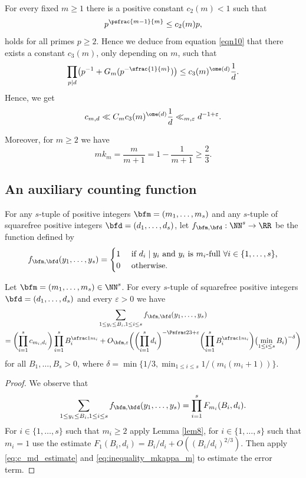 For every fixed $m\geq 1$ there is a positive constant $c_2(m)<1$ such that
\[
p^{\psfrac{m-1}{m}}\leq c_2(m) p,
\]
holds for all primes $p\geq 2$. Hence we deduce from equation \eqref{eqn10}
that there exists a constant $c_3(m)$, only depending on $m$, such that
\begin{equation}\label{eqn11}
\prod_{p\mid d} \bigl(p^{-1}+G_{m}(p^{-\sfrac{1}{m}})\bigr)
\leq c_3(m)^{\ome(d)}\frac{1}{d}.
\end{equation}
Hence, we get
\begin{equation}
\label{eq:c_md_estimate}
c_{m,d}
\ll C_m c_3(m)^{\ome(d)}\frac{1}{d}
\ll_{m,\varepsilon}d^{-1+\varepsilon}.
\end{equation}

Moreover, for $m\geq 2$ we have
\begin{equation}
\label{eq:inequality_mkappa_m}
m k_m=\frac m{m+1}=1-\frac 1{m+1}\geq \frac 23.
\end{equation}

\subsection{An auxiliary counting function}
\label{sec:counting_function_f}
For any $s$-tuple of positive integers $\bfm=(m_1,\dots,m_s)$ and any $s$-tuple of squarefree positive integers $\bfd=(d_1,\dots,d_s)$,
let $f_{\bfm, \bfd} : \NN^s \to \RR$ be the function defined by
\[
f_{\bfm, \bfd}(y_1,\dots,y_s)=\begin{cases}
1 & \text{ if $d_i\mid y_i$ and $y_i$ is $m_i$-full $ \forall i\in\{1,\dots,s\}$,}\\
0 & \text{ otherwise.}
\end{cases}
\]
\begin{lemma}
\label{lem:counting_function_f}
Let $\bfm=(m_1,\dots,m_s)\in\NN^s$. For every $s$-tuple of squarefree positive integers $\bfd=(d_1,\dots,d_s)$ and every $\varepsilon>0$ we have
\begin{multline*}
\sum_{1\leq y_i\leq B_i, 1\leq i\leq s} f_{\bfm, \bfd}(y_1,\dots,y_s) \\
=\biggl(\prod_{i=1}^s c_{m_i,d_i}\biggr)\prod_{i=1}^s B_i^{\sfrac1{m_i} }
+O_{\bfm, \varepsilon}\biggl(\biggl(\prod_{i=1}^sd_i\biggr)^{-\Psfrac23+\varepsilon}\biggl(\prod_{i=1}^s B_i^{\sfrac1{m_i}}\biggr)\bigl(\min_{1\leq i\leq s} B_i\bigr)^{-\delta}\biggr)
\end{multline*}
for all $B_1,\dots,B_s>0$,
where $\delta=\min \{ 1/3 , \min_{1\leq i\leq s}1/(m_i(m_i+1)) \}$.
\end{lemma}
\begin{proof}
We observe that
\[
\sum_{1\leq y_i\leq B_i, 1\leq i\leq s} f_{\bfm, \bfd}(y_1,\dots,y_s) = \prod_{i=1}^s F_{m_i}(B_i,d_i).
\]
For $i\in\{1,\dots,s\}$ such that $m_i\geq 2$ apply Lemma \ref{lem8}, for $i\in\{1,\dots, s\}$ such that $m_i=1$ use the estimate $F_1(B_i,d_i)= B_i/d_i + O((B_i/d_i)^{2/3})$.
Then apply \eqref{eq:c_md_estimate} and \eqref{eq:inequality_mkappa_m} to estimate the error term.
\end{proof}

